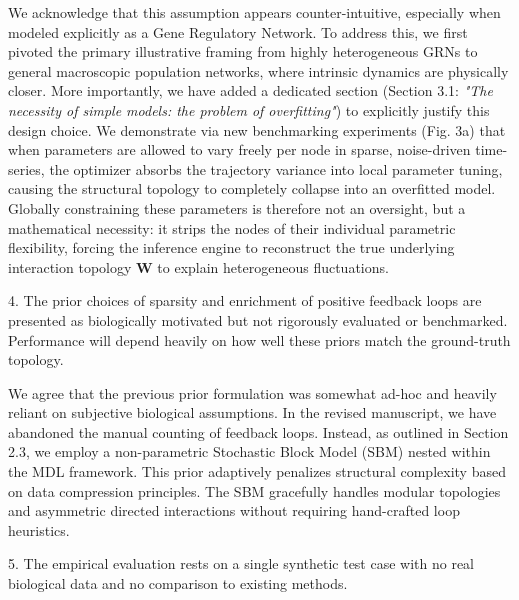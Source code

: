 \documentclass[11pt,a4paper]{article}
\begin{document}
We acknowledge that this assumption appears counter-intuitive, especially when modeled explicitly as a Gene Regulatory Network. To address this, we first pivoted the primary illustrative framing from highly heterogeneous GRNs to general macroscopic population networks, where intrinsic dynamics are physically closer.
More importantly, we have added a dedicated section (Section 3.1: \textit{"The necessity of simple models: the problem of overfitting"}) to explicitly justify this design choice. We demonstrate via new benchmarking experiments (Fig. 3a) that when parameters are allowed to vary freely per node in sparse, noise-driven time-series, the optimizer absorbs the trajectory variance into local parameter tuning, causing the structural topology to completely collapse into an overfitted model. Globally constraining these parameters is therefore not an oversight, but a mathematical necessity: it strips the nodes of their individual parametric flexibility, forcing the inference engine to reconstruct the true underlying interaction topology $\mathbf{W}$ to explain heterogeneous fluctuations.

\begin{reviewercomment}
4. The prior choices of sparsity and enrichment of positive feedback loops are presented as biologically motivated but not rigorously evaluated or benchmarked. Performance will depend heavily on how well these priors match the ground-truth topology.
\end{reviewercomment}

We agree that the previous prior formulation was somewhat ad-hoc and heavily reliant on subjective biological assumptions. In the revised manuscript, we have abandoned the manual counting of feedback loops. Instead, as outlined in Section 2.3, we employ a non-parametric Stochastic Block Model (SBM) nested within the MDL framework. This prior adaptively penalizes structural complexity based on data compression principles. The SBM gracefully handles modular topologies and asymmetric directed interactions without requiring hand-crafted loop heuristics.

\begin{reviewercomment}
5. The empirical evaluation rests on a single synthetic test case with no real biological data and no comparison to existing methods.
\end{reviewercomment}
\end{document}
